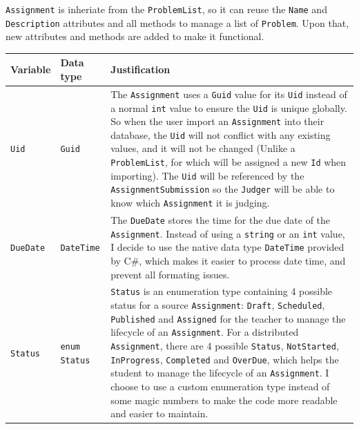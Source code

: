 \documentclass[a4paper]{report}
\begin{document}
\texttt{Assignment} is inheriate from the \texttt{ProblemList}, so it can reuse the \texttt{Name} and \texttt{Description} attributes and all methods to manage a list of \texttt{Problem}. Upon that, new attributes and methods are added to make it functional.

\begin{tabulary}{\textwidth}{|l|l|L|}
    \hline
    Variable & Data type & Justification \\
    \hline
    \texttt{Uid} & \texttt{Guid} & The \texttt{Assignment} uses a \texttt{Guid} value for its \texttt{Uid} instead of a normal \texttt{int} value to ensure the \texttt{Uid} is unique globally. So when the user import an \texttt{Assignment} into their database, the \texttt{Uid} will not conflict with any existing values, and it will not be changed (Unlike a \texttt{ProblemList}, for which will be assigned a new \texttt{Id} when importing). The \texttt{Uid} will be referenced by the \texttt{AssignmentSubmission} so the \texttt{Judger} will be able to know which \texttt{Assignment} it is judging. \\
    \hline
    \texttt{DueDate} & \texttt{DateTime} & The \texttt{DueDate} stores the time for the due date of the \texttt{Assignment}. Instead of using a \texttt{string} or an \texttt{int} value, I decide to use the native data type \texttt{DateTime} provided by C\#, which makes it easier to process date time, and prevent all formating issues. \\
    \hline
    \texttt{Status} & \texttt{enum Status} & \texttt{Status} is an enumeration type containing 4 possible status for a source \texttt{Assignment}: \texttt{Draft}, \texttt{Scheduled}, \texttt{Published} and \texttt{Assigned} for the teacher to manage the lifecycle of an \texttt{Assignment}. For a distributed \texttt{Assignment}, there are 4 possible \texttt{Status}, \texttt{NotStarted}, \texttt{InProgress}, \texttt{Completed} and \texttt{OverDue}, which helps the student to manage the lifecycle of an \texttt{Assignment}. I choose to use a custom enumeration type instead of some magic numbers to make the code more readable and easier to maintain.\\

\end{tabulary}
\end{document}

